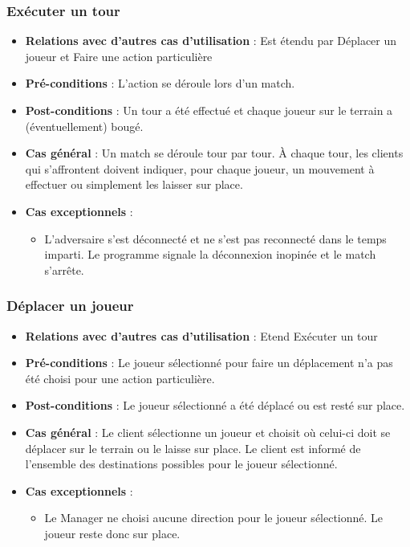 \documentclass[a4paper,titlepage]{scrreprt}
\begin{document}
    \subsubsection{Exécuter un tour}
      \begin{itemize}
        \item \textbf{Relations avec d'autres cas d'utilisation}  : Est étendu par Déplacer un joueur et Faire une action particulière
        \item \textbf{Pré-conditions} : L'action se déroule lors d'un match.
        \item \textbf{Post-conditions} : Un tour a été effectué et chaque joueur sur le terrain a (éventuellement) bougé.
        \item \textbf{Cas général} : Un match se déroule tour par tour. À chaque tour, les clients qui s’affrontent doivent indiquer, pour chaque joueur, un mouvement à effectuer ou simplement les laisser sur place.
        \item \textbf{Cas exceptionnels} :
          \begin{itemize}
            \item L’adversaire s’est déconnecté et ne s’est pas reconnecté dans le temps imparti. Le programme signale la déconnexion inopinée et le match s’arrête.
          \end{itemize}
      \end{itemize}
    \subsubsection{Déplacer un joueur}
      \begin{itemize}
        \item \textbf{Relations avec d'autres cas d'utilisation}  : Etend Exécuter un tour
        \item \textbf{Pré-conditions} : Le joueur sélectionné pour faire un déplacement n’a pas été choisi pour une action particulière.
        \item \textbf{Post-conditions} : Le joueur sélectionné a été déplacé ou est resté sur place.
        \item \textbf{Cas général} : Le client sélectionne un joueur et choisit où celui-ci doit se déplacer sur le terrain ou le laisse sur place. Le client est informé de l’ensemble des destinations possibles pour le joueur sélectionné.
        \item \textbf{Cas exceptionnels} : 
        \begin{itemize}
            \item Le Manager ne choisi aucune direction pour le joueur sélectionné. Le joueur reste donc sur place.
          \end{itemize}
      \end{itemize}
\end{document}

